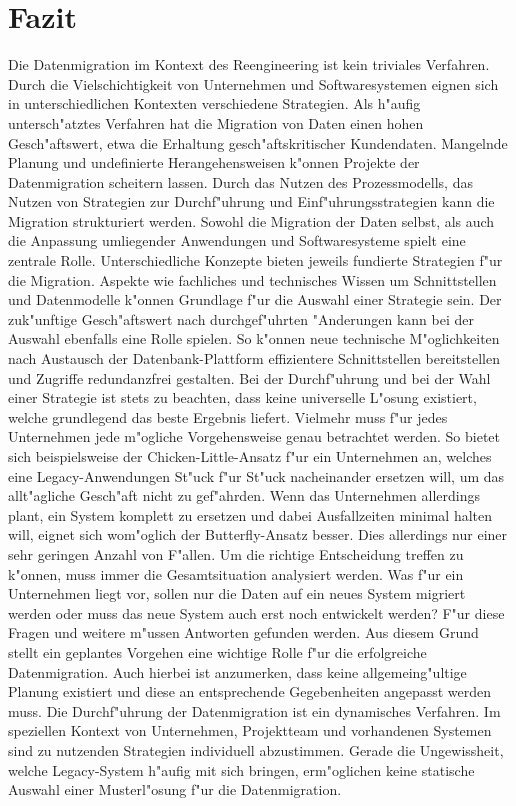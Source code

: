 \section{Fazit}
\label{chapter:fazit}

Die Datenmigration im Kontext des Reengineering ist kein triviales Verfahren. Durch die Vielschichtigkeit von Unternehmen und Softwaresystemen eignen sich in unterschiedlichen Kontexten verschiedene Strategien. Als h"aufig untersch"atztes Verfahren hat die Migration von Daten einen hohen Gesch"aftswert, etwa die Erhaltung gesch"aftskritischer Kundendaten. Mangelnde Planung und undefinierte Herangehensweisen k"onnen Projekte der Datenmigration scheitern lassen. Durch das Nutzen des Prozessmodells, das Nutzen von Strategien zur Durchf"uhrung und Einf"uhrungsstrategien kann die Migration strukturiert werden.
\lb
Sowohl die Migration der Daten selbst, als auch die Anpassung umliegender Anwendungen und Softwaresysteme spielt eine zentrale Rolle. Unterschiedliche Konzepte bieten jeweils fundierte Strategien f"ur die Migration. Aspekte wie fachliches und technisches Wissen um Schnittstellen und Datenmodelle k"onnen Grundlage f"ur die Auswahl einer Strategie sein. Der zuk"unftige Gesch"aftswert nach durchgef"uhrten "Anderungen kann bei der Auswahl ebenfalls eine Rolle spielen. So k"onnen neue technische M"oglichkeiten nach Austausch der Datenbank-Plattform effizientere Schnittstellen bereitstellen und Zugriffe redundanzfrei gestalten.
\lb
Bei der Durchf"uhrung und bei der Wahl einer Strategie ist stets zu beachten, dass keine universelle L"osung existiert, welche grundlegend das beste Ergebnis liefert. Vielmehr muss f"ur jedes Unternehmen jede m"ogliche Vorgehensweise genau betrachtet werden. So bietet sich beispielsweise der Chicken-Little-Ansatz f"ur ein Unternehmen an, welches eine Legacy-Anwendungen St"uck f"ur St"uck nacheinander ersetzen will, um das allt"agliche Gesch"aft nicht zu gef"ahrden. Wenn das Unternehmen allerdings plant, ein System komplett zu ersetzen und dabei Ausfallzeiten minimal halten will, eignet sich wom"oglich der Butterfly-Ansatz besser. Dies allerdings nur einer sehr geringen Anzahl von F"allen.
\lb
Um die richtige Entscheidung treffen zu k"onnen, muss immer die Gesamtsituation analysiert werden. Was f"ur ein Unternehmen liegt vor, sollen nur die Daten auf ein neues System migriert werden oder muss das neue System auch erst noch entwickelt werden? F"ur diese Fragen und weitere m"ussen Antworten gefunden werden. Aus diesem Grund stellt ein geplantes Vorgehen eine wichtige Rolle f"ur die erfolgreiche Datenmigration. Auch hierbei ist anzumerken, dass keine allgemeing"ultige Planung existiert und diese an entsprechende Gegebenheiten angepasst werden muss. 
\lb
Die Durchf"uhrung der Datenmigration ist ein dynamisches Verfahren. Im speziellen Kontext von Unternehmen, Projektteam und vorhandenen Systemen sind zu nutzenden Strategien individuell abzustimmen. Gerade die Ungewissheit, welche Legacy-System h"aufig mit sich bringen, erm"oglichen keine statische Auswahl einer Musterl"osung f"ur die Datenmigration.